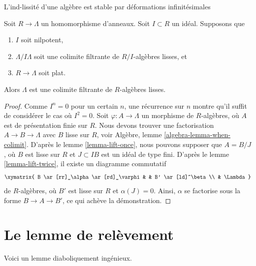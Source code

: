\begin{proposition}
\label{proposition-lift}
\begin{slogan}
L'ind-lissité d'une algèbre est stable par déformations infinitésimales
\end{slogan}
Soit $R \to \Lambda$ un homomorphisme d'anneaux. Soit $I \subset R$ un idéal.
Supposons que
\begin{enumerate}
\item $I$ soit nilpotent,
\item $\Lambda/I\Lambda$ soit une colimite filtrante de $R/I$-algèbres lisses, et
\item $R \to \Lambda$ soit plat.
\end{enumerate}
Alors $\Lambda$ est une colimite filtrante de $R$-algèbres lisses.
\end{proposition}

\begin{proof}
Comme $I^n = 0$ pour un certain $n$, une récurrence sur $n$ montre qu'il
suffit de considérer le cas où $I^2 = 0$. Soit
$\varphi : A \to \Lambda$ un morphisme de $R$-algèbres, où $A$ est de
présentation finie sur $R$. Nous devons trouver une factorisation $A \to B \to \Lambda$
avec $B$ lisse sur $R$, voir Algèbre, lemme \ref{algebra-lemma-when-colimit}.
D'après le lemme \ref{lemma-lift-once}, nous pouvons supposer que
$A = B/J$, où $B$ est lisse sur $R$ et $J \subset IB$
est un idéal de type fini. D'après le
lemme \ref{lemma-lift-twice},
il existe un diagramme commutatif
$$
\xymatrix{
B \ar[rr]_\alpha \ar[rd]_\varphi & & B' \ar[ld]^\beta \\
& \Lambda
}
$$
de $R$-algèbres, où $B'$ est lisse sur $R$ et $\alpha(J) = 0$.
Ainsi, $\alpha$ se factorise sous la forme $B \to A \to B'$, ce qui achève la démonstration.
\end{proof}






\section{Le lemme de relèvement}
\label{section-lifting-lemma}

\noindent
Voici un lemme diaboliquement ingénieux.

